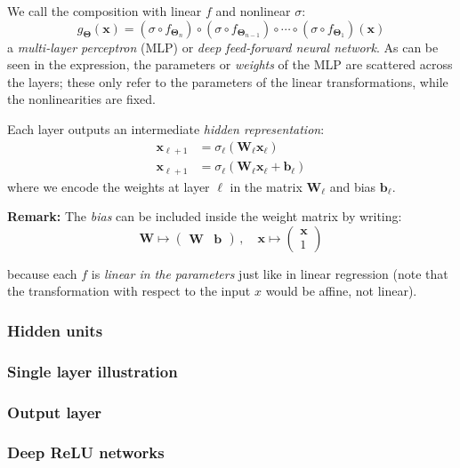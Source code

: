
We call the composition with linear $f$ and nonlinear $\sigma$:
\begin{equation}
    g_{\bm{\Theta}}(\mathbf{x}) =
	(\sigma \circ f_{\bm{\Theta}_n}) 
	\circ (\sigma \circ f_{\bm{\Theta}_{n-1}})
	\circ \cdots 
	\circ (\sigma \circ  f_{\bm{\Theta}_1})(\mathbf{x}) 
\end{equation}
a \emph{multi-layer perceptron} (MLP) or \emph{deep feed-forward neural network}. As can be seen in the expression, the parameters or \emph{weights} of the MLP are scattered across the layers; these only refer to the parameters of the linear transformations, while the nonlinearities are fixed.

Each layer outputs an intermediate \emph{hidden representation}:
\begin{align}
        \mathbf{x}_{\ell+1} &= \sigma_\ell(  \mathbf{W}_\ell \mathbf{x}_{\ell}  ) \\
	    \mathbf{x}_{\ell+1} &= \sigma_\ell(  \mathbf{W}_\ell \mathbf{x}_{\ell} + \mathbf{b}_\ell )    
\end{align}
where we encode the weights at layer $\ell$ in the matrix $\mathbf{W}_\ell$ and bias $\mathbf{b}_\ell$.

\textbf{Remark:} The \emph{bias} can be included inside the weight matrix by writing:
\begin{equation}
	\mathbf{W} \mapsto \begin{pmatrix}\mathbf{W}&\mathbf{b}\end{pmatrix}\,,\quad \mathbf{x}\mapsto \begin{pmatrix}\mathbf{x}\\1\end{pmatrix} 
\end{equation}

because each $f$ is \emph{linear in the parameters} just like in linear regression (note that the transformation with respect to the input $x$ would be affine, not linear).

\subsubsection{Hidden units} 


\subsubsection{Single layer illustration} 


\subsubsection{Output layer} 


\subsubsection{Deep ReLU networks} 

